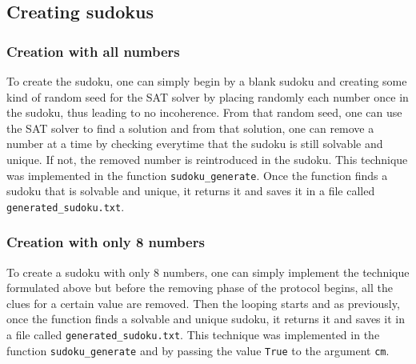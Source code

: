 \subsection{Creating sudokus}
\subsubsection{Creation with all numbers}
To create the sudoku, one can simply begin by a blank sudoku and creating some kind of random seed for the SAT solver by placing randomly each number once in the sudoku, thus leading to no incoherence.
From that random seed, one can use the SAT solver to find a solution and from that solution, one can remove a number at a time by checking everytime that the sudoku is still solvable and unique. If not, the removed number is reintroduced in the sudoku.
This technique was implemented in the function \verb|sudoku_generate|. Once the function finds a sudoku that is solvable and unique, it returns it and saves it in a file called \verb|generated_sudoku.txt|.

\subsubsection{Creation with only 8 numbers}
To create a sudoku with only 8 numbers, one can simply implement the technique formulated above but before the removing phase of the protocol begins, all the clues for a certain value are removed. Then the looping starts and as previously, once the function finds a solvable and unique sudoku, 
it returns it and saves it in a file called \verb|generated_sudoku.txt|. This technique was implemented in the function \verb|sudoku_generate| and by passing the value \verb|True| to the argument \verb|cm|.
